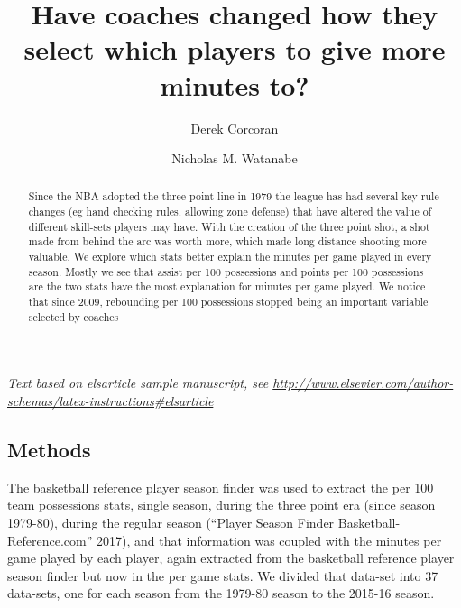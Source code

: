 \documentclass[]{elsarticle} %
\begin{document}
\begin{frontmatter}

  \title{Have coaches changed how they select which players to give more minutes
to?}
    \author[Pontificia Universidad Catolica de Chile]{Derek Corcoran}
    \author[The University of Mississippi]{Nicholas M. Watanabe}
  
      \address[Some Institute of Technology]{Department, Street, City, State, Zip}
    \address[Another University]{Department, Street, City, State, Zip}
  
  \begin{abstract}
  Since the NBA adopted the three point line in 1979 the league has had
  several key rule changes (eg hand checking rules, allowing zone defense)
  that have altered the value of different skill-sets players may have.
  With the creation of the three point shot, a shot made from behind the
  arc was worth more, which made long distance shooting more valuable. We
  explore which stats better explain the minutes per game played in every
  season. Mostly we see that assist per 100 possessions and points per 100
  possessions are the two stats have the most explanation for minutes per
  game played. We notice that since 2009, rebounding per 100 possessions
  stopped being an important variable selected by coaches
  \end{abstract}
  
 \end{frontmatter}

\emph{Text based on elsarticle sample manuscript, see
\url{http://www.elsevier.com/author-schemas/latex-instructions\#elsarticle}}

\subsection{Methods}\label{methods}

The basketball reference player season finder was used to extract the
per 100 team possessions stats, single season, during the three point
era (since season 1979-80), during the regular season (``Player Season
Finder Basketball-Reference.com'' 2017), and that information was
coupled with the minutes per game played by each player, again extracted
from the basketball reference player season finder but now in the per
game stats. We divided that data-set into 37 data-sets, one for each
season from the 1979-80 season to the 2015-16 season.
\end{document}
